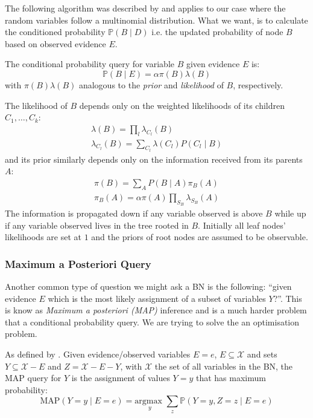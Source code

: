 The following algorithm was described by \cite{Normand1992} and applies to our case where the random variables follow a multinomial distribution.
What we want, is to calculate the conditioned probability $\mathbb{P}(B \mid D)$ i.e. the updated probability of node $B$ based on observed evidence $E$.
\begin{definition}
	The conditional probability query for variable $B$ given evidence $E$ is:
\begin{equation} \label{eq:bnupdating}
	\mathbb{P}(B \mid E) = \alpha \pi(B) \lambda(B)
\end{equation}
with $\pi(B) \lambda(B)$ analogous to the \textit{prior} and \textit{likelihood} of $B$, respectively.
\end{definition}
The likelihood of $B$ depends only on the weighted likelihoods of its children $C_1, \ldots ,C_k$:\begin{align}
	\lambda(B) = \prod_l \lambda_{C_l}(B) \\
	\lambda_{C_{l}}(B)=\sum_{C_{l}} \lambda\left(C_{l}\right) P\left(C_{l} \mid B\right)
\end{align}
and its prior similarly depends only on the information received from its parents $A$:
\begin{align}
	\pi(B)=\sum_{A} P(B \mid A) \pi_{B}(A) \\
	\pi_{B}(A)=\alpha \pi(A) \prod_{S_{B}} \lambda_{S_{B}}(A)
\end{align}
The information is propagated down if any variable observed is above $B$ while up if any variable observed lives in the tree rooted in $B$.
Initially all leaf nodes' likelihoods are set at $1$ and the priors of root nodes are assumed to be observable.

\subsubsection{Maximum a Posteriori Query}
Another common type of question we might ask a BN is the following: ``given evidence $E$ which is the most likely assignment of a subset of variables $Y$?''.
This is know as \textit{Maximum a posteriori (MAP)} inference and is a much harder problem that a conditional probability query.
We are trying to solve the an optimisation problem.
\begin{definition}
As defined by \cite{koller2007introduction}.
Given evidence/observed variables $E=e$, $E \subseteq \mathcal{X}$ and sets $Y \subseteq \mathcal{X} - E$ and $Z = \mathcal{X} - E - Y$, with $\mathcal{X}$ the set of all variables in the BN, the MAP query for $Y$ is the assignment of values $Y=y$ that has maximum probability:
	\begin{equation} \label{eq:map}
	\text{MAP}( Y=y \mid E=e ) = \underset{y}{\text{argmax }}  \sum_z \mathbb{P}(Y=y, Z=z \mid E=e)
\end{equation}
\end{definition}



